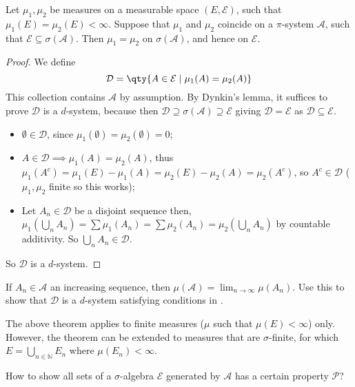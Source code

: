 \begin{theorem}
	Let $\mu_1, \mu_2$ be measures on a measurable space $(E, \mathcal E)$, such that $\mu_1(E) = \mu_2(E) < \infty$.
	Suppose that $\mu_1$ and $\mu_2$ coincide on a $\pi$-system $\mathcal A$, such that $\mathcal E \subseteq \sigma(\mathcal A)$.
	Then $\mu_1 = \mu_2$ on $\sigma(\mathcal A)$, and hence on $\mathcal E$.
\end{theorem}

\begin{proof}
	We define
	\[ \mathcal D = \qty{A \in \mathcal E \mid \mu_1(A) = \mu_2(A)} \]
	This collection contains $\mathcal A$ by assumption.
	By Dynkin's lemma, it suffices to prove $\mathcal D$ is a $d$-system, because then $\mathcal D \supseteq \sigma(\mathcal A) \supseteq \mathcal E$ giving $\mathcal D = \mathcal E$ as $\mathcal{D} \subseteq \mathcal{E}$.

	\begin{itemize}
		\item $\emptyset \in \mathcal{D}$, since $\mu_1(\emptyset) = \mu_2(\emptyset) = 0$;
		\item $A \in \mathcal{D} \implies \mu_1(A) = \mu_2(A)$, thus $\mu_1(A^c) = \mu_1(E) - \mu_1(A) = \mu_2(E) - \mu_2(A) = \mu_2(A^c)$, so $A^c \in \mathcal{D}$ ($\mu_1, \mu_2$ finite so this works);
		\item Let $A_n \in \mathcal{D}$ be a disjoint sequence then, $\mu_1(\bigcup_n A_n) = \sum \mu_1(A_n) = \sum \mu_2(A_n) = \mu_2(\bigcup_n A_n)$ by countable additivity. So $\bigcup_n A_n \in \mathcal{D}$.
	\end{itemize}
	So $\mathcal{D}$ is a $d$-system.
\end{proof}

\begin{remark}
	If $A_n \in \mathcal{A}$ an increasing sequence, then $\mu(\mathcal{A}) = \lim_{n \to \infty} \mu(A_n)$.
	Use this to show that $\mathcal{D}$ is a $d$-system satisfying conditions in .

	The above theorem applies to finite measures ($\mu$ such that $\mu(E) < \infty$) only.
	However, the theorem can be extended to measures that are $\sigma$-finite, for which $E = \bigcup_{n \in \mathbb N} E_n$ where $\mu(E_n) < \infty$.
\end{remark}

\begin{question}
	How to show all sets of a $\sigma$-algebra $\mathcal{E}$ generated by $\mathcal{A}$ has a certain property $\mathcal{P}$?
\end{question}

